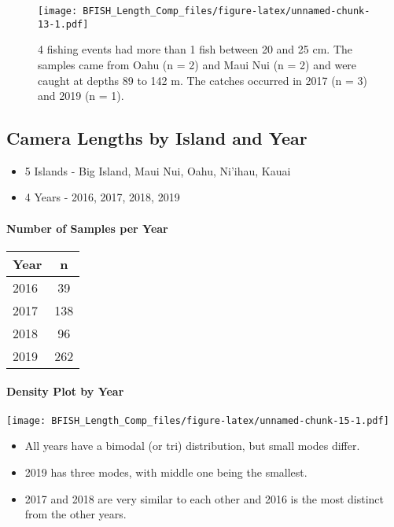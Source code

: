 \documentclass[
]{article}
\providecommand{\tightlist}{%
  \setlength{\itemsep}{0pt}\setlength{\parskip}{0pt}}
\begin{document}
\begin{figure}
\centering
\texttt{[image: BFISH\_Length\_Comp\_files/figure-latex/unnamed-chunk-13-1.pdf]}
\caption{4 fishing events had more than 1 fish between 20 and 25 cm. The
samples came from Oahu (n = 2) and Maui Nui (n = 2) and were caught at
depths 89 to 142 m. The catches occurred in 2017 (n = 3) and 2019 (n =
1).}
\end{figure}

\hypertarget{camera-lengths-by-island-and-year}{%
\subsection{Camera Lengths by Island and
Year}\label{camera-lengths-by-island-and-year}}

\begin{itemize}
\tightlist
\item
  5 Islands - Big Island, Maui Nui, Oahu, Ni'ihau, Kauai
\item
  4 Years - 2016, 2017, 2018, 2019
\end{itemize}

\hypertarget{number-of-samples-per-year}{%
\paragraph{Number of Samples per
Year}\label{number-of-samples-per-year}}

\captionsetup[table]{labelformat=empty,skip=1pt}
\begin{longtable}{lc}
\toprule
Year & n \\ 
\midrule
2016 & 39 \\ 
2017 & 138 \\ 
2018 & 96 \\ 
2019 & 262 \\ 
\bottomrule
\end{longtable}

\hypertarget{density-plot-by-year}{%
\paragraph{Density Plot by Year}\label{density-plot-by-year}}

\texttt{[image: BFISH\_Length\_Comp\_files/figure-latex/unnamed-chunk-15-1.pdf]}

\begin{itemize}
\tightlist
\item
  All years have a bimodal (or tri) distribution, but small modes
  differ.\\
\item
  2019 has three modes, with middle one being the smallest.\\
\item
  2017 and 2018 are very similar to each other and 2016 is the most
  distinct from the other years.
\end{itemize}
\end{document}
